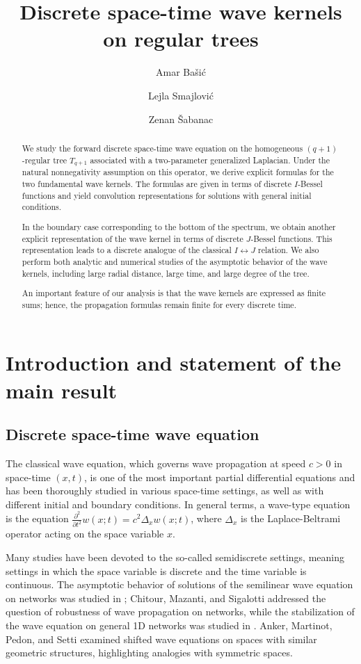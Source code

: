 \documentclass[12pt]{amsart}
\title{Discrete space-time wave kernels on regular trees}
\author{Amar Ba\v{s}i\'{c}}
\author{Lejla Smajlovi\'{c}}
\author{Zenan \v{S}abanac}
\date{}
\numberwithin{equation}{section}
\theoremstyle{boldremark}
\begin{document}
\begin{abstract}
We study the forward discrete space-time wave equation on the homogeneous $(q+1)$-regular tree $T_{q+1}$ associated with a two-parameter generalized Laplacian. Under the natural nonnegativity assumption on this operator, we derive explicit formulas for the two fundamental wave kernels. The formulas are given in terms of discrete $I$-Bessel functions and yield convolution representations for solutions with general initial conditions.

In the boundary case corresponding to the bottom of the spectrum, we obtain another explicit representation of the wave kernel in terms of discrete $J$-Bessel functions. This representation leads to a discrete analogue of the classical $I\!\leftrightarrow\!J$ relation. We also perform both analytic and numerical studies of the asymptotic behavior of the wave kernels, including large radial distance, large time, and large degree of the tree.

An important feature of our analysis is that the wave kernels are expressed as finite sums; hence, the propagation formulas remain finite for every discrete time.
\end{abstract}

\maketitle


\section{Introduction and statement of the main result}\label{sec1}

\subsection{Discrete space-time wave equation}

The classical wave equation, which governs wave propagation at speed $c>0$ in space-time $(x,t)$, is one of the most important partial differential equations and has been thoroughly studied in various space-time settings, as well as with different initial and boundary conditions. In general terms, a wave-type equation is the equation $\frac{\partial^2 }{\partial t^2} w(x;t)=c^2 \Delta_x w(x;t)$, where $\Delta_x$ is the Laplace-Beltrami operator acting on the space variable $x$.

Many studies have been devoted to the so-called semidiscrete settings, meaning settings in which the space variable is discrete and the time variable is continuous. The asymptotic behavior of solutions of the semilinear wave equation on networks was studied in \cite{Ch22}; Chitour, Mazanti, and Sigalotti \cite{CMS16} addressed the question of robustness of wave propagation on networks, while the stabilization of the wave equation on general 1D networks was studied in \cite{VZ09}. Anker, Martinot, Pedon, and Setti \cite{AMPS13} examined shifted wave equations on spaces with similar geometric structures, highlighting analogies with symmetric spaces.
\end{document}

